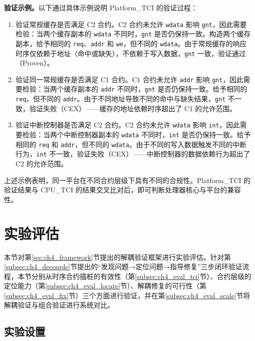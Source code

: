 \textbf{验证示例。}以下通过具体示例说明 Platform\_TCI 的验证过程：

\begin{enumerate}
    \item 验证常规缓存是否满足 C2 合约。C2 合约未允许 \texttt{wdata} 影响 \texttt{gnt}，因此需要检验：当两个缓存副本的 \texttt{wdata} 不同时，\texttt{gnt} 是否仍保持一致。构造两个缓存副本，给予相同的 \texttt{req}、\texttt{addr} 和 \texttt{we}，但不同的 \texttt{wdata}。由于常规缓存的响应时序仅依赖于地址（命中或缺失），不依赖于写入数据，\texttt{gnt} 一致，验证通过（Proven）。
    \item 验证同一常规缓存是否满足 C1 合约。C1 合约未允许 \texttt{addr} 影响 \texttt{gnt}，因此需要检验：当两个缓存副本的 \texttt{addr} 不同时，\texttt{gnt} 是否仍保持一致。给予相同的 \texttt{req}，但不同的 \texttt{addr}。由于不同地址导致不同的命中与缺失结果，\texttt{gnt} 不一致，验证失败（CEX）——缓存的地址依赖时序超出了 C1 的允许范围。
    \item 验证中断控制器是否满足 C2 合约。C2 合约未允许 \texttt{wdata} 影响 \texttt{int}，因此需要检验：当两个中断控制器副本的 \texttt{wdata} 不同时，\texttt{int} 是否仍保持一致。给予相同的 \texttt{req} 和 \texttt{addr}，但不同的 \texttt{wdata}。由于不同的写入数据触发不同的中断行为，\texttt{int} 不一致，验证失败（CEX）——中断控制器的数据依赖行为超出了 C2 的允许范围。
\end{enumerate}

上述示例表明，同一平台在不同合约层级下具有不同的合规性。Platform\_TCI 的验证结果与 CPU\_TCI 的结果交叉比对后，即可判断处理器核心与平台的兼容性。


\section{实验评估}
\label{sec:ch4_experiment}

本节对第\ref{sec:ch4_framework}节提出的解耦验证框架进行实验评估。针对第\ref{subsec:ch4_decouple}节提出的``发现问题→定位问题→指导修复''三步闭环验证流程，本节分别从时序合约插桩的有效性（第\ref{subsec:ch4_eval_tci}节）、合约层级的定位能力（第\ref{subsec:ch4_eval_locate}节）、解耦修复的可行性（第\ref{subsec:ch4_eval_fix}节）三个方面进行验证，并在第\ref{subsec:ch4_eval_scale}节将解耦验证与组合验证进行系统对比。

\subsection{实验设置}
\label{subsec:ch4_setup}

